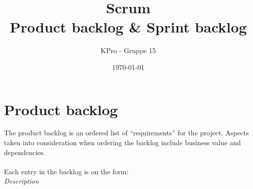 \documentclass[a4paper, norsk, 12pt]{article}
\author{KPro - Gruppe 15}
\title{
	Scrum\\
	Product backlog \& Sprint backlog
}
\date{\today}
\begin{document}
	\maketitle
	\pagebreak
	\tableofcontents
	\pagebreak
	\section{Product backlog}
		The product backlog is an ordered list of ``requirements'' for the project. Aspects taken into consideration when ordering the backlog include business value and dependencies.\\\\
		Each entry in the backlog is on the form:\\
			 {\it Description}
		
\end{document}
